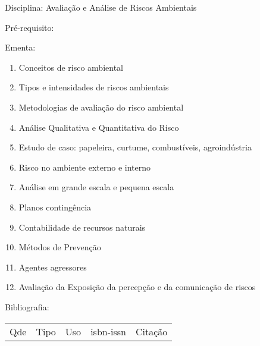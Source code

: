 \documentclass[12pt,a4paper,twoside]{report}
\begin{document}
Disciplina: Avaliação e Análise de Riscos Ambientais

Pré-requisito:
\begin{enumerate}
\end{enumerate}

Ementa:
\begin{enumerate}
\item Conceitos de risco ambiental
\item Tipos e intensidades de riscos ambientais
\item Metodologias de avaliação do risco ambiental
\item Análise Qualitativa e Quantitativa do Risco
\item Estudo de caso: papeleira, curtume, combustíveis, agroindústria
\item Risco no ambiente externo e interno
\item Análise em grande escala e pequena escala
\item Planos contingência
\item Contabilidade de recursos naturais
\item Métodos de Prevenção
\item Agentes agressores
\item Avaliação da Exposição da percepção e da comunicação de riscos
\end{enumerate}

Bibliografia:
\begin{tabular}{lllll}
Qde & Tipo & Uso & isbn-issn & Citação \\
\end{tabular}
\end{document}
